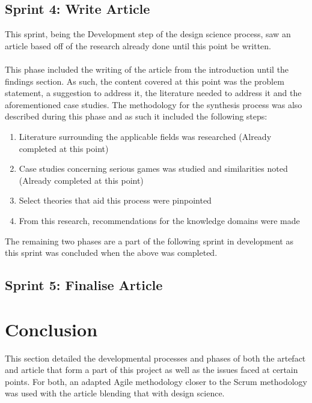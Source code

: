 \subsection{Sprint 4: Write Article}
This sprint, being the Development step of the design science process, saw an article based off of the research already done until this point be written. 
\\\\
This phase included the writing of the article from the introduction until the findings section. As such, the content covered at this point was the problem statement, a suggestion to address it, the literature needed to address it and the aforementioned case studies. The methodology for the synthesis process was also described during this phase and as such it included the following steps:
\begin{enumerate}
\item Literature surrounding the applicable fields was researched (Already completed at this point)
\item Case studies concerning serious games was studied and similarities noted (Already completed at this point)
\item Select theories that aid this process were pinpointed 
\item From this research, recommendations for the knowledge domains were made
\end{enumerate}

\noindent The remaining two phases are a part of the following sprint in development as this sprint was concluded when the above was completed.


\subsection{Sprint 5: Finalise Article}






\section{Conclusion}
This section detailed the developmental processes and phases of both the artefact and article that form a part of this project as well as the issues faced at certain points. For both, an adapted Agile methodology closer to the Scrum methodology was used with the article blending that with design science.
